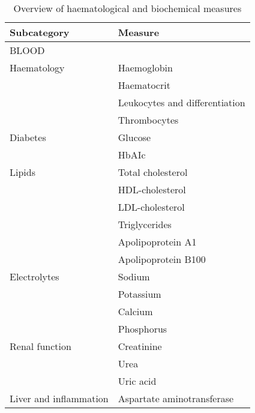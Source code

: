 \vspace{1cm}
\begin{table}[H]
    \caption{Overview of haematological and biochemical measures}
    \begin{tabular}{ll}
    \hline
    \textbf{Subcategory}   & \textbf{Measure}                    \\ \hline
    \multicolumn{2}{l}{BLOOD}                                    \\
    Haematology            & Haemoglobin                         \\
                           & Haematocrit                         \\
                           & Leukocytes and differentiation      \\
                           & Thrombocytes                        \\
    Diabetes               & Glucose                             \\
                           & HbAIc                               \\
    Lipids                 & Total cholesterol                   \\
                           & HDL-cholesterol                     \\
                           & LDL-cholesterol                     \\
                           & Triglycerides                       \\
                           & Apolipoprotein A1                   \\
                           & Apolipoprotein B100                 \\
    Electrolytes           & Sodium                              \\
                           & Potassium                           \\
                           & Calcium                             \\
                           & Phosphorus                          \\
    Renal function         & Creatinine                          \\
                           & Urea                                \\
                           & Uric acid                           \\
    Liver and inflammation & Aspartate aminotransferase          \\

\end{tabular}
\end{table}
